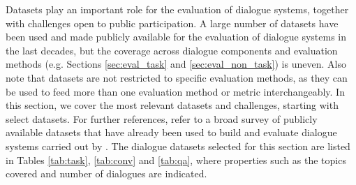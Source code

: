 \label{sec:eval_task}


\label{sec:eval_non_task}


\label{sec:eva_qa_dialogue}


\label{sec:datasets}
Datasets play an important role for the evaluation of dialogue systems, together with challenges open to public participation. A large number of datasets have been used and made publicly available for the evaluation of dialogue systems in the last decades, but the coverage across dialogue components and evaluation methods (e.g. Sections \ref{sec:eval_task} and \ref{sec:eval_non_task}) is uneven. Also note that datasets are not restricted to specific evaluation methods, as they can be used to feed more than one evaluation method or metric interchangeably. In this section, we cover the most relevant datasets and challenges, starting with select datasets. For further references, refer to a broad survey of publicly available datasets that have already been used to build and evaluate dialogue systems carried out by .
The dialogue datasets selected for this section are listed in Tables \ref{tab:task}, \ref{tab:conv} and \ref{tab:qa}, where properties such as the topics covered and number of dialogues are indicated.

